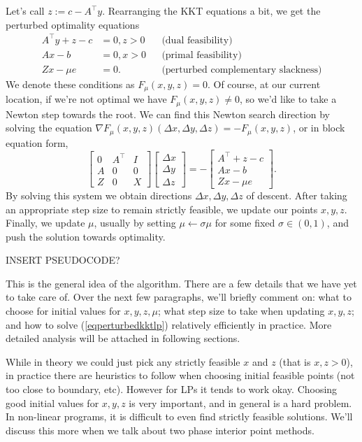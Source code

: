 \documentclass{article}
\numberwithin{equation}{section}
\theoremstyle{definition}
\begin{document}
Let's call $z:=c-A^\top y$. Rearranging the KKT equations a bit, we get the perturbed optimality equations
\begin{align}
        A^\top y+z-c&=0, z>0 &&\text{(dual feasibility)}\\
        Ax-b&=0, x>0 && \text{(primal feasibility)}\\
        Zx-\mu e&=0. && \text{(perturbed complementary slackness)}
\end{align}
We denote these conditions as $F_\mu(x,y,z)=0$. Of course, at our current location, if we're not optimal we have $F_\mu(x,y,z)\neq 0$, so we'd like to take a Newton step towards the root. We can find this Newton search direction by solving the equation $\nabla F_\mu(x,y,z)(\Delta x, \Delta y, \Delta z)=-F_\mu(x,y,z)$, or in block equation form,
\begin{equation}
    \label{eqperturbedkktlp}
    \begin{bmatrix}
     0&A^\top&I\\A&0&0\\Z&0&X
    \end{bmatrix}
    \begin{bmatrix}
        \Delta x\\\Delta y\\\Delta z
    \end{bmatrix}
    =-\begin{bmatrix}
        A^\top+z-c\\Ax-b\\Zx-\mu e
    \end{bmatrix}.
\end{equation}
By solving this system we obtain directions $\Delta x, \Delta y, \Delta z$ of descent. After taking an appropriate step size to remain strictly feasible, we update our points $x, y, z$. Finally, we update $\mu$, usually by setting $\mu\gets\sigma\mu$ for some fixed $\sigma\in(0,1)$, and push the solution towards optimality.

INSERT PSEUDOCODE?

This is the general idea of the algorithm. There are a few details that we have yet to take care of. Over the next few paragraphs, we'll briefly comment on: what to choose for initial values for $x, y, z, \mu$; what step size to take when updating $x, y, z$; and how to solve (\ref{eqperturbedkktlp}) relatively efficiently in practice. More detailed analysis will be attached in following sections.

While in theory we could just pick any strictly feasible $x$ and $z$ (that is $x, z>0$), in practice there are heuristics to follow when choosing initial feasible points (not too close to boundary, etc). However for LPs it tends to work okay. Choosing good initial values for $x, y, z$ is very important, and in general is a hard problem. In non-linear programs, it is difficult to even find strictly feasible solutions. We'll discuss this more when we talk about two phase interior point methods.
\end{document}
